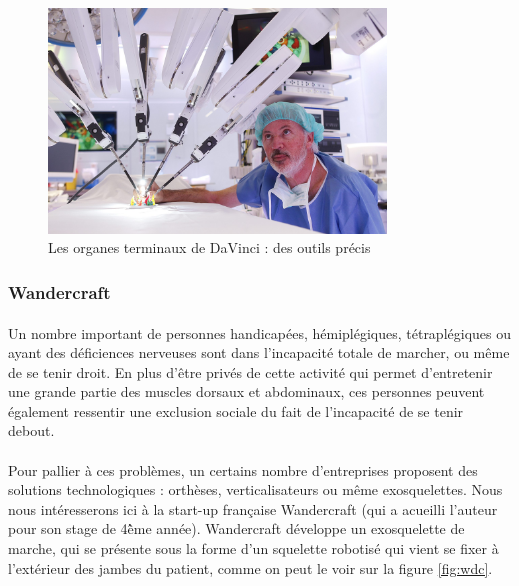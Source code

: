 \documentclass[a4paper,10pt]{article}
\begin{document}
                
                
                 \begin{figure}[h!]
                     \centering
                     \includegraphics[width=0.8\textwidth]{Antonio_M_Lacy.jpg}
                     \caption{Les organes terminaux de DaVinci : des outils précis}
                     \label{fig:davinci}
                 \end{figure}                
                 
            \subsubsection{Wandercraft}
                
                \paragraph{}
                    Un nombre important de personnes handicapées, hémiplégiques, tétraplégiques ou 
                    ayant des déficiences nerveuses sont dans l'incapacité totale de marcher, 
                    ou même de se tenir droit. En plus d'être privés de cette activité qui 
                    permet d'entretenir une grande partie des muscles dorsaux et abdominaux, 
                    ces personnes peuvent également ressentir une exclusion sociale du fait 
                    de l'incapacité de se tenir debout. 
                    
                \paragraph{}
                    Pour pallier à ces problèmes, un certains nombre d'entreprises proposent
                    des solutions technologiques : orthèses, verticalisateurs ou même exosquelettes. 
                    Nous nous intéresserons ici à la start-up française Wandercraft (qui a 
                    acueilli l'auteur pour son stage de 4\^{ème} année). 
                    Wandercraft développe un exosquelette de marche, qui se présente sous la forme 
                    d'un squelette robotisé qui vient se fixer à l'extérieur des jambes du patient, 
                    comme on peut le voir sur la figure \ref{fig:wdc}.
                
\end{document}
